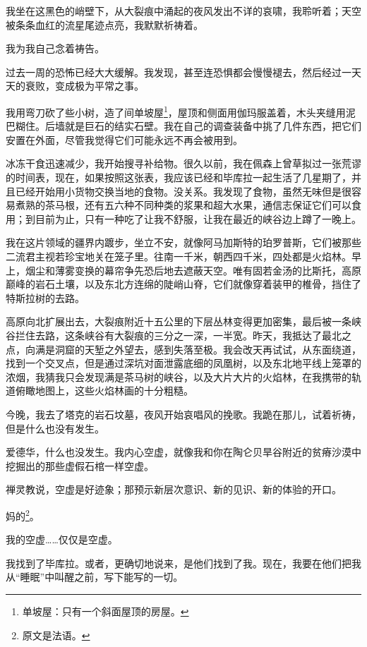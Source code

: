 \documentclass[AutoFakeBold=true]{book}
\begin{document}
我坐在这黑色的峭壁下，从大裂痕中涌起的夜风发出不详的哀啸，我聆听着；天空被条条血红的流星尾迹点亮，我默默祈祷着。

我为我自己念着祷告。

\vspace*{1em}{\kaishu 第九十五日：}

过去一周的恐怖已经大大缓解。我发现，甚至连恐惧都会慢慢褪去，然后经过一天天的衰败，变成极为平常之事。

我用弯刀砍了些小树，造了间单坡屋\footnote{单坡屋：只有一个斜面屋顶的房屋。}，屋顶和侧面用伽玛服盖着，木头夹缝用泥巴糊住。后墙就是巨石的结实石壁。我在自己的调查装备中挑了几件东西，把它们安置在外面，尽管我觉得它们可能永远不再会被用到。

冰冻干食迅速减少，我开始搜寻补给物。很久以前，我在佩森上曾草拟过一张荒谬的时间表，现在，如果按照这张表，我应该已经和毕库拉一起生活了几星期了，并且已经开始用小货物交换当地的食物。没关系。我发现了食物，虽然无味但是很容易煮熟的茶马根，还有五六种不同种类的浆果和超大水果，通信志保证它们可以食用；到目前为止，只有一种吃了让我不舒服，让我在最近的峡谷边上蹲了一晚上。

我在这片领域的疆界内踱步，坐立不安，就像阿马加斯特的珀罗普斯，它们被那些二流君主视若珍宝地关在笼子里。往南一千米，朝西四千米，四处都是火焰林。早上，烟尘和薄雾变换的幕帘争先恐后地去遮蔽天空。唯有固若金汤的比斯托，高原巅峰的岩石土壤，以及东北方连绵的陡峭山脊，它们就像穿着装甲的椎骨，挡住了特斯拉树的去路。

高原向北扩展出去，大裂痕附近十五公里的下层丛林变得更加密集，最后被一条峡谷拦住去路，这条峡谷有大裂痕的三分之一深，一半宽。昨天，我抵达了最北之点，向满是洞窟的天堑之外望去，感到失落至极。我会改天再试试，从东面绕道，找到一个交叉点，但是通过深坑对面泄露底细的凤凰树，以及东北地平线上笼罩的浓烟，我猜我只会发现满是茶马树的峡谷，以及大片大片的火焰林，在我携带的轨道俯瞰地图上，这些火焰林画的十分粗糙。

今晚，我去了塔克的岩石坟墓，夜风开始哀唱风的挽歌。我跪在那儿，试着祈祷，但是什么也没有发生。

爱德华，什么也没发生。我内心空虚，就像我和你在陶仑贝旱谷附近的贫瘠沙漠中挖掘出的那些虚假石棺一样空虚。

禅灵教说，空虚是好迹象；那预示新层次意识、新的见识、新的体验的开口。

{\kaishu 妈的}\footnote{原文是法语。}。

我的空虚……仅仅是空虚。

\vspace*{1em}{\kaishu 第九十六日：}

我找到了毕库拉。或者，更确切地说来，是他们找到了我。现在，我要在他们把我从``睡眠''中叫醒之前，写下能写的一切。
\end{document}
